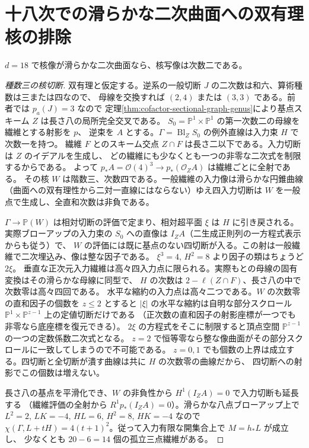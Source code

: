 \section{十八次での滑らかな二次曲面への双有理核の排除}
\label{sec:cofactor-eighteen-birational-quadric}
\begin{theorem}\label{thm:cofactor-eighteen-birational-quadric}
$d=18$ で核像が滑らかな二次曲面なら、核写像は次数二である。
\end{theorem}
\begin{proof}[種数三の核切断]
双有理と仮定する。逆系の一般切断 $J$ の二次数は和六、算術種数は三または四なので、
母線を交換すれば $(2,4)$ または $(3,3)$ である。前者では $p_a(J)=3$ なので
定理\ref{thm:cofactor-sectional-graph-genus}により基点スキーム $Z$ は長さ八の局所完全交叉である。
$S_0=\mathbb P^1\times\mathbb P^1$ の第一次数二の母線を繊維とする射影を $p$、
逆束を $A$ とする。$\Gamma=\operatorname{Bl}_Z S_0$ の例外直線は入力束 $H$ で次数一を持つ。
繊維 $F$ とのスキーム交点 $Z\cap F$ は長さ二以下である。入力切断は $Z$ のイデアルを生成し、
どの繊維にも少なくとも一つの非零な二次式を制限するからである。
よって $p_* A=\mathcal O(4)^3\to p_*(\mathcal O_Z A)$ は繊維ごとに全射である。
その核 $W$ は階数三、次数四である。一般繊維の入力像は滑らかな円錐曲線
（曲面への双有理性から二対一直線にはならない）ゆえ四入力切断は $W$ を一般点で生成し、全直和次数は非負である。

$\Gamma\to\mathbb P(W)$ は相対切断の評価で定まり、相対超平面 $\xi$ は $H$ に引き戻される。
実際ブローアップの入力束の $S_0$ への直像は $I_Z A$（二生成正則列の一方程式表示からも従う）で、
$W$ の評価には既に基点のない四切断が入る。この射は一般繊維で二次埋込み、像は整な因子である。
$\xi^3=4$, $H^2=8$ より因子の類はちょうど $2\xi$。
垂直な正次元入力繊維は高々四入力点に限られる。実際もとの母線の固有変換はその滑らかな母線に同型で、
$H$ の次数は $2-\ell(Z\cap F)$、長さ八の中で次数零は高々四回である。
水平な縮約の入力点は高々二つである。$W$ の次数零の直和因子の個数を $z\le2$ とすると
$|\xi|$ の水平な縮約は自明な部分スクロール $\mathbb P^1\times\mathbb P^{z-1}$ 上の定値切断だけである
（正次数の直和因子の射影座標が一つでも非零なら底座標を復元できる）。
$2\xi$ の方程式をそこに制限すると頂点空間 $\mathbb P^{z-1}$ の一つの定数係数二次式となる。
$z=2$ で恒等零なら整な像曲面がその部分スクロールに一致してしまうので不可能である。
$z=0,1$ でも個数の上界は成立する。四切断と全切断が潰す曲線は共に $H$ の次数零の曲線だから、
四切断への射影でこの個数は増えない。

長さ八の基点を平滑化でき、$W$ の非負性から $H^1(I_Z A)=0$ で入力切断も延長する
（繊維評価の全射から $R^1p_*(I_Z A)=0$）。滑らかな八点ブローアップ上で
$L^2=2$, $LK=-4$, $HL=6$, $H^2=8$, $HK=-4$ なので
$\chi(\Gamma,L+tH)=4(t+1)^2$。従って入力有限な開集合上で $M=h_*L$ が成立し、
少なくとも $20-6=14$ 個の孤立三点繊維がある。


\end{proof}
